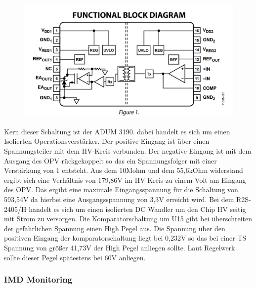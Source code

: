 \begin{figure}
	\centering
	\includegraphics[width=0.4\linewidth]{"bilder/Blockdiagramm ADUM3190"}
	\caption{}
	\label{fig:blockdiagramm-adum3190}
\end{figure}

Kern dieser Schaltung ist der ADUM 3190. dabei handelt es sich um einen Isolierten Operationsverstärker. Der positive Eingang ist über einen Spannungsteiler mit dem HV-Kreis verbunden. Der negative Eingang ist mit dem Ausgang des OPV rückgekoppelt so das ein Spannungsfolger mit einer Verstärkung von 1 entsteht. Aus dem 10Mohm und dem 55,6kOhm widerstand ergibt sich eine Verhältnis von 179,86V im HV Kreis zu einem Volt am Eingang des OPV. Das ergibt eine maximale Eingangsspannung für die Schaltung von 593,54V da hierbei eine Ausgangsspannung von 3,3V erreicht wird. Bei dem R2S-2405/H handelt es sich um einen isolierten DC Wandler um den Chip HV seitig mit Strom zu versorgen. Die Komparatorschaltung um U15 gibt bei überschreiten der gefährlichen Spannung einen High Pegel aus. Die Spannung über den positiven Eingang der komparatorschaltung liegt bei 0,232V so das bei einer TS Spannung von größer 41,73V der High Pegel anliegen sollte. Laut Regelwerk sollte dieser Pegel spätestens bei 60V anliegen.

\FloatBarrier
\subsubsection{IMD Monitoring}

